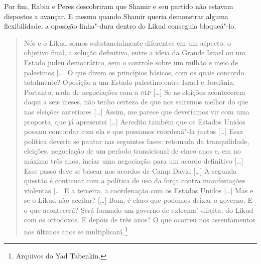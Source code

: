 Por fim, Rabin e Peres descobriram que Shamir e seu partido não estavam
dispostos a avançar. E mesmo quando Shamir queria demonstrar alguma
flexibilidade, a oposição linha"-dura dentro do Likud conseguia
bloqueá"-lo.


\begin{quote}
Nós e o Likud somos substancialmente diferentes em um aspecto: o
objetivo final, a solução definitiva, entre a ideia da Grande Israel ou
um Estado judeu democrático, sem o controle sobre um milhão e meio de
palestinos {[}\ldots{}{]} O que dizem os princípios básicos, com os quais concordo
totalmente? Oposição a um Estado palestino entre Israel e Jordânia.
Portanto, nada de negociações com a \textsc{olp} {[}\ldots{}{]} Se as eleições acontecerem
daqui a seis meses, não tenho certeza de que nos sairemos melhor do que
nas eleições anteriores {[}\ldots{}{]} Assim, me parece que deveríamos vir com uma
proposta, que já apresentei {[}\ldots{}{]} Acredito também que os Estados Unidos
possam concordar com ela e que possamos coordená"-la juntos {[}\ldots{}{]} Essa
política deveria se pautar nas seguintes fases: retomada da
tranquilidade, eleições, negociação de um período transicional de cinco
anos e, em no máximo três anos, inciar uma negociação para um acordo
definitivo {[}\ldots{}{]} Esse passo deve se basear nos acordos de Camp David
{[}\ldots{}{]} A
segunda questão é continuar com a política de uso da força contra
manifestações violentas {[}\ldots{}{]} E a terceira, a coordenação com os Estados
Unidos {[}\ldots{}{]} Mas e se o Likud não aceitar? {[}\ldots{}{]} Bom, é claro que podemos
deixar o governo. E o que acontecerá? Será formado um governo de
extrema"-direita, do Likud com os ortodoxos. E depois de três anos? O que
ocorreu nos assentamentos nos últimos anos se multiplicará.\footnote{Arquivos do
  Yad Tabenkin.}
\end{quote}


